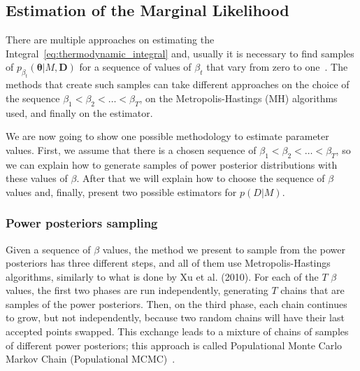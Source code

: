 \subsection{Estimation of the Marginal Likelihood}
\label{sec:estimation_of_marginal_likelihood}
There are multiple approaches on estimating the 
Integral~\ref{eq:thermodynamic_integral} and, usually it is necessary to 
find samples of $p_{\beta_t} ({\bm \theta} | M, {\bm D})$ for a sequence 
of values of $\beta_t$ that vary from zero to one~\cite{Xura20, 
Vyshemirsky2007, Friel2008}. The methods that create such samples can 
take different approaches on the choice of the sequence $\beta_1 < 
\beta_2 < \ldots < \beta_T$, on the Metropolis-Hastings (MH) algorithms 
used, and finally on the estimator.

We are now going to show one possible methodology to estimate parameter 
values. First, we assume that there is a chosen sequence of $\beta_1 <
\beta_2 < \ldots < \beta_T$, so we can explain how to generate samples 
of power posterior distributions with these values of $\beta$. After
that we will explain how to choose the sequence of $\beta$ values and,
finally, present two possible estimators for $p (D | M)$.

\subsubsection{Power posteriors sampling}
\label{sec:power_posteriors_sampling}
Given a sequence of $\beta$ values, the method we present to sample from 
the power posteriors has three different steps, and all of them use
Metropolis-Hastings algorithms, similarly to what is done by Xu et al. 
(2010). For each of the $T$ $\beta$ values, the first two phases are
run independently, generating $T$ chains that are samples of the power 
posteriors. Then, on the third phase, each chain continues to grow, but
not independently, because two random chains will have their last 
accepted points swapped. This exchange leads to a mixture of chains of
samples of different power posteriors; this approach is called 
Populational Monte Carlo Markov Chain (Populational 
MCMC)~\cite{Friel2008}.

